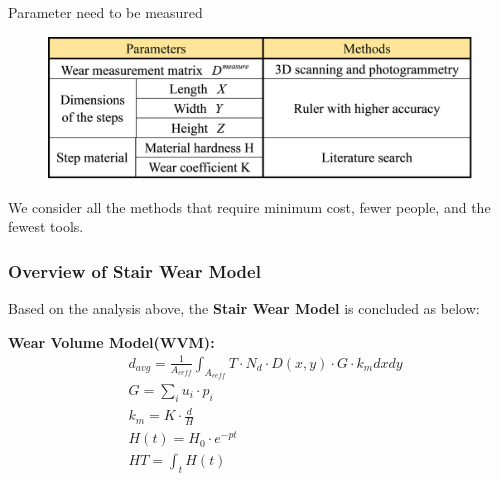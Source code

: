 \documentclass[12pt]{article}  %
\numberwithin{equation}{section} %
\begin{document}
\begin{table}[H]
    \centering
    \vspace{-1.0em}
    \caption{Parameter need to be measured}
    \vspace{-1.0em}
        \begin{figure}[H]
    	\centering
    	\includegraphics[width=0.8\linewidth]{美赛Latex模板/parametertable.png}
        \end{figure}
    \label{parametertable}
\end{table}

\vspace{-2.0em}

We consider all the methods that require minimum cost, fewer people, and the fewest tools.
\subsubsection{Overview of Stair Wear Model}
Based on the analysis above, the\textbf{ Stair Wear Model }is concluded as below:

\textbf{Wear Volume Model(WVM):}\\
\begin{equation}
\begin{aligned}
    & d_{avg} = \frac{1}{A_{ceff}}\int_{A_{ceff}} T\cdot{N_d}\cdot{D(x,y)}\cdot{G}\cdot{k_m}dxdy\\
    & G=\sum_{i}u_i\cdot{p_i}\\
    & k_m = K\cdot{\frac{d}{H}}\\
    & H(t)=H_0⋅e^{{-}{pt}}\\
    & {H}{T}=\int_{t}H(t)\\
\end{aligned}
\label{MVM}
\end{equation}
\end{document}
